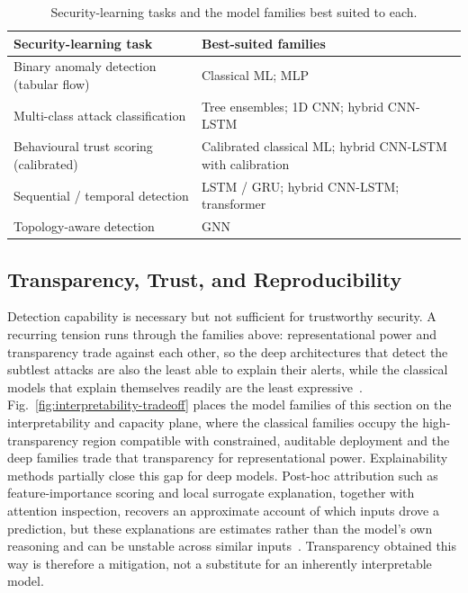 \begin{table}[!htbp]
  \centering
  \caption{Security-learning tasks and the model families best suited to each.}
  \label{tab:task-family-fit}
  \renewcommand{\arraystretch}{1.3}
  \begin{tabularx}{\textwidth}{@{}l >{\raggedright\arraybackslash}X@{}}
    \toprule
    \textbf{Security-learning task} & \textbf{Best-suited families} \\
    \midrule
    Binary anomaly detection (tabular flow)   & Classical ML; MLP \\
    Multi-class attack classification          & Tree ensembles; 1D CNN; hybrid CNN-LSTM \\
    Behavioural trust scoring (calibrated)     & Calibrated classical ML; hybrid CNN-LSTM with calibration \\
    Sequential / temporal detection            & LSTM / GRU; hybrid CNN-LSTM; transformer \\
    Topology-aware detection                   & GNN \\
    \bottomrule
  \end{tabularx}
\end{table}

\subsection{Transparency, Trust, and Reproducibility}
\label{subsec:transparency-trust}

Detection capability is necessary but not sufficient for trustworthy security. A
recurring tension runs through the families above: representational power and
transparency trade against each other, so the deep architectures that detect the
subtlest attacks are also the least able to explain their alerts, while the
classical models that explain themselves readily are the least
expressive~\cite{sharma2024explainable, mohale2025systematic}.
Fig.~\ref{fig:interpretability-tradeoff} places the model families of this
section on the interpretability and capacity plane, where the classical families
occupy the high-transparency region compatible with constrained, auditable
deployment and the deep families trade that transparency for representational
power. Explainability methods partially close this gap for deep models. Post-hoc
attribution such as feature-importance scoring and local surrogate explanation,
together with attention inspection, recovers an approximate account of which
inputs drove a prediction, but these explanations are estimates rather than the
model's own reasoning and can be unstable across similar
inputs~\cite{gaspar2024explainable, wali2025explainable}. Transparency obtained
this way is therefore a mitigation, not a substitute for an inherently
interpretable model.

